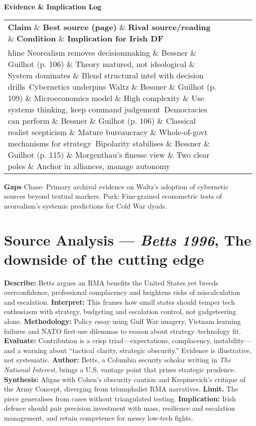 \textbf{Evidence \& Implication Log}
\begin{tabular}{p{3.2cm}p{4.2cm}p{3.6cm}p{3.2cm}p{4.2cm}}
	\textbf{Claim} \& \textbf{Best source (page)} \& \textbf{Rival source/reading} \& \textbf{Condition} \& \textbf{Implication for Irish DF}\\hline
	Neorealism removes decisionmaking \& Bessner \& Guilhot (p. 106) \& Theory matured, not ideological \& System dominates \& Blend structural intel with decision drills\
	Cybernetics underpins Waltz \& Bessner \& Guilhot (p. 109) \& Microeconomics model \& High complexity \& Use systems thinking, keep command judgement\
	Democracies can perform \& Bessner \& Guilhot (p. 106) \& Classical realist scepticism \& Mature bureaucracy \& Whole-of-govt mechanisms for strategy\
	Bipolarity stabilises \& Bessner \& Guilhot (p. 115) \& Morgenthau’s finesse view \& Two clear poles \& Anchor in alliances, manage autonomy\
\end{tabular}

\textbf{Gaps}
Chase: Primary archival evidence on Waltz’s adoption of cybernetic sources beyond textual markers.
Park: Fine-grained econometric tests of neorealism’s systemic predictions for Cold War dyads.


\parencite{BETTS_1996}

\section*{Source Analysis — \textit{Betts 1996}, The downside of the cutting edge}
\textbf{Describe:} Betts argues an RMA benefits the United States yet breeds overconfidence, professional complacency and heightens risks of miscalculation and escalation.
\textbf{Interpret:} This frames how small states should temper tech enthusiasm with strategy, budgeting and escalation control, not gadgeteering alone.
\textbf{Methodology:} Policy essay using Gulf War imagery, Vietnam learning failures and NATO first-use dilemmas to reason about strategy–technology fit.
\textbf{Evaluate:} Contribution is a crisp triad—expectations, complacency, instability—and a warning about “tactical clarity, strategic obscurity.” Evidence is illustrative, not systematic.
\textbf{Author:} Betts, a Columbia security scholar writing in \textit{The National Interest}, brings a U.S. vantage point that prizes strategic prudence.
\textbf{Synthesis:} Aligns with Cohen’s obscurity caution and Krepinevich’s critique of the Army Concept, diverging from triumphalist RMA narratives.
\textbf{Limit.} The piece generalises from cases without triangulated testing.
\textbf{Implication:} Irish defence should pair precision investment with mass, resilience and escalation management, and retain competence for messy low-tech fights.

